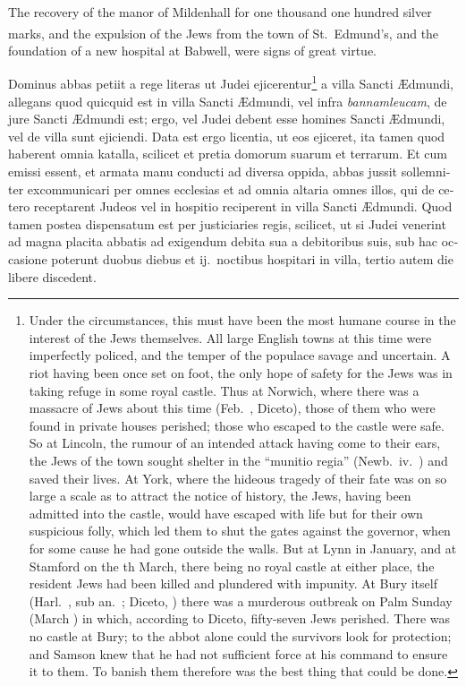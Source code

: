 \documentclass[10pt]{book}
\newcounter{engnote}
\newcommand{\engnotenum}{\textsuperscript{\arabic{engnote}\stepcounter{engnote}}}
\begin{document}
\begin{paracol}{2}
\begin{otherlanguage}{latin}
\end{otherlanguage}

\switchcolumn

The recovery of the manor of Mildenhall for one thousand one hundred silver marks, and the expulsion of the Jews\engnotenum{} from the town of St.\ Edmund's, and the foundation of a new hospital at Babwell, were signs of great virtue.

\switchcolumn*

\begin{otherlanguage}{latin}
Dominus abbas petiit a rege literas ut Judei
ejicerentur\footnote[\textdagger]{Under the circumstances, this must have been the most humane course in the interest of the Jews themselves. All large English towns at this time were imperfectly policed, and the temper of the populace savage and uncertain. A riot having been once set on foot, the only hope of safety for the Jews was in taking refuge in some royal castle. Thus at Norwich, where there was a massacre of Jews about this time (Feb.\ , Diceto), those of them who were found in private houses perished; those who escaped to the castle were safe. So at Lincoln, the rumour of an intended attack having come to their ears, the Jews of the town sought shelter in the ``munitio regia'' (Newb.\ iv.\ ) and saved their lives. At York, where the hideous tragedy of their fate was on so large a scale as to attract the notice of history, the Jews, having been admitted into the castle, would have escaped with life but for their own suspicious folly, which led them to shut the gates against the governor, when for some cause he had gone outside the walls. But at Lynn in January, and at Stamford on the th March, there being no royal castle at either place, the resident Jews had been killed and plundered with impunity. At Bury itself (Harl.\ , sub an.\ ; Diceto, ) there was a murderous outbreak on Palm Sunday (March ) in which, according to Diceto, fifty-seven Jews perished. There was no castle at Bury; to the abbot alone could the survivors look for protection; and Samson knew that he had not sufficient force at his command to ensure it to them. To banish them therefore was the best thing that could be done.} a villa Sancti \AE{}dmundi, allegans quod
quicquid est in villa Sancti \AE{}dmundi, vel infra \emph{bannamleucam}, de jure Sancti \AE{}dmundi est; ergo, vel Judei debent esse homines Sancti \AE{}dmundi, vel de villa sunt ejiciendi. Data est ergo licentia, ut eos ejiceret, ita tamen quod haberent omnia katalla, scilicet et pretia domorum suarum et terrarum. Et cum emissi essent, et armata manu conducti ad diversa oppida, abbas jussit sollemniter excommunicari per omnes ecclesias et ad omnia altaria omnes illos, qui de cetero receptarent Judeos vel in hospitio reciperent in villa Sancti \AE{}dmundi. Quod tamen postea dispensatum est per justiciaries regis, scilicet, ut si Judei venerint ad magna placita abbatis ad exigendum debita sua a debitoribus suis, sub hac occasione poterunt duobus diebus et ij.\ noctibus hospitari in villa, tertio autem die libere discedent.
\end{otherlanguage}


\end{paracol}
\end{document}
